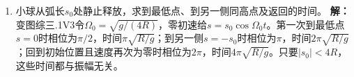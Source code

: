 \documentclass[UTF8,fontset=fandol,a4paper,11pt]{ctexart}
\begin{document}
\begin{enumerate}
\item 小球从弧长$s_0$处静止释放，求到最低点、到另一侧同高点及返回的时间。
\textbf{解：}变图综三.1V3令$\Omega_0=\sqrt{g/(4R)}$，零初速给$s=s_0\cos\Omega_0t$。第一次到最低点$s=0$时相位为$\pi/2$，时间$\pi\sqrt{R/g}$；到另一侧$s=-s_0$时相位为$\pi$，时间$2\pi\sqrt{R/g}$；回到初始位置且速度再次为零时相位为$2\pi$，时间$4\pi\sqrt{R/g}$。只要$|s_0|<4R$，这些时间都与振幅无关。
\begin{center}\begin{minipage}{.98\linewidth}\centering
{}
\end{minipage}
\end{center}
\end{enumerate}
\end{document}
